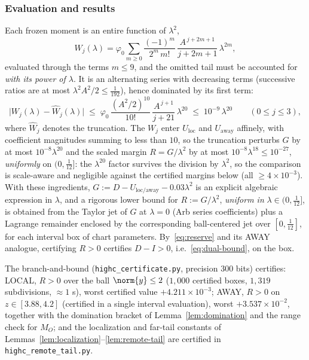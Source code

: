 \subsubsection*{Evaluation and results}

Each frozen moment is an entire function of $\lambda^2$,
\[
        W_j(\lambda)=\varphi_0\sum_{m\ge0}\frac{(-1)^m}{2^m\,m!}\,\frac{A^{\,j+2m+1}}{j+2m+1}\,\lambda^{2m},
\]
evaluated through the terms $m\le9$, and the omitted tail must be accounted for \emph{with its power of $\lambda$}. It is an alternating series with decreasing terms (successive ratios are at most $\lambda^2A^2/2\le\tfrac1{192}$), hence dominated by its first term:
\[
        \bigl|W_j(\lambda)-\widehat W_j(\lambda)\bigr|
        \;\le\;\varphi_0\,\frac{(A^2/2)^{10}}{10!}\,\frac{A^{\,j+1}}{j+21}\,\lambda^{20}
        \;\le\;10^{-9}\,\lambda^{20}
        \qquad(0\le j\le3),
\]
where $\widehat W_j$ denotes the truncation. The $W_j$ enter $U_{\mathrm{loc}}$ and $U_{\mathrm{away}}$ affinely, with coefficient magnitudes summing to less than $10$, so the truncation perturbs $G$ by at most $10^{-8}\lambda^{20}$ and the scaled margin $R=G/\lambda^2$ by at most $10^{-8}\lambda^{18}\le10^{-27}$, \emph{uniformly} on $(0,\tfrac1{12}]$: the $\lambda^{20}$ factor survives the division by $\lambda^2$, so the comparison is scale-aware and negligible against the certified margins below (all $\ge4\times10^{-3}$). With these ingredients, $G:=D-U_{\mathrm{loc/away}}-0.03\lambda^2$ is an explicit algebraic expression in $\lambda$, and a rigorous lower bound for $R:=G/\lambda^2$, \emph{uniform in} $\lambda\in(0,\tfrac1{12}]$, is obtained from the Taylor jet of $G$ at $\lambda=0$ (Arb series coefficients) plus a Lagrange remainder enclosed by the corresponding ball-centered jet over $[0,\tfrac1{12}]$, for each interval box of chart parameters. By~\eqref{eq:reserve} and its AWAY analogue, certifying $R>0$ certifies $D-I>0$, i.e.~\eqref{eq:dual-bound}, on the box.

The branch-and-bound (\texttt{highc\_certificate.py}, precision $300$ bits) certifies: LOCAL, $R>0$ over the ball $\norm{y}\le2$ ($1{,}000$ certified boxes, $1{,}319$ subdivisions, $\approx1$ s), worst certified value $+4.211\times10^{-3}$; AWAY, $R>0$ on $z\in[3.88,4.2]$ (certified in a single interval evaluation), worst $+3.537\times10^{-2}$, together with the domination bracket of Lemma~\ref{lem:domination} and the range check for $M_O$; and the localization and far-tail constants of Lemmas~\ref{lem:localization}--\ref{lem:remote-tail} are certified in \texttt{highc\_remote\_tail.py}.

